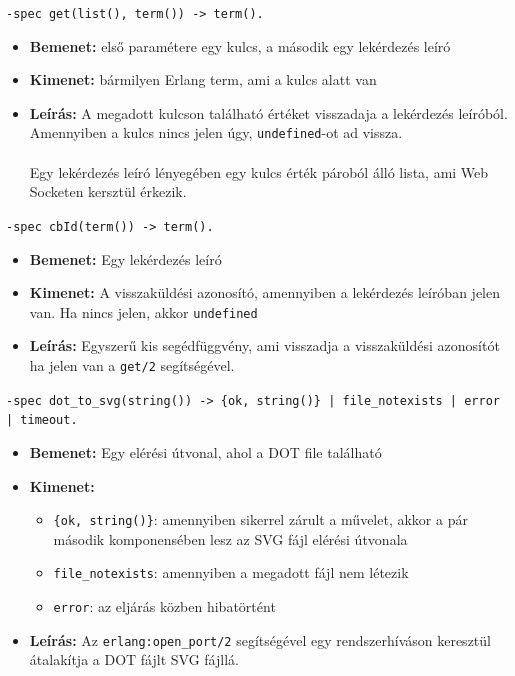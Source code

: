 \noindent \lstinline{-spec get(list(), term()) -> term().}
\begin{itemize}
    \item \textbf{Bemenet:} első paramétere egy kulcs, a második egy lekérdezés leíró
    \item \textbf{Kimenet:} bármilyen Erlang term, ami a kulcs alatt van
    \item \textbf{Leírás:} A megadott kulcson található értéket visszadaja a lekérdezés leíróból. Amennyiben a kulcs nincs jelen úgy, \lstinline{undefined}-ot ad vissza.\\ \\ Egy lekérdezés leíró lényegében egy kulcs érték pároból álló lista, ami Web Socketen kersztül érkezik.
\end{itemize} 

\noindent \lstinline{-spec cbId(term()) -> term().}
\begin{itemize}
    \item \textbf{Bemenet:} Egy lekérdezés leíró
    \item \textbf{Kimenet:} A visszaküldési azonosító, amennyiben a lekérdezés leíróban jelen van. Ha nincs jelen, akkor \lstinline{undefined}
    \item \textbf{Leírás:} Egyszerű kis segédfüggvény, ami visszadja a visszaküldési azonosítót ha jelen van a \lstinline{get/2} segítségével.
\end{itemize} 

\noindent \lstinline|-spec dot_to_svg(string()) -> {ok, string()} |\lstinline{| file_notexists | error | timeout.}
\begin{itemize}
    \item \textbf{Bemenet:} Egy elérési útvonal, ahol a DOT file található
    \item \textbf{Kimenet:} 
    \begin{itemize}
        \item \lstinline|{ok, string()}|: amennyiben sikerrel zárult a művelet, akkor a pár második komponensében lesz az SVG fájl elérési útvonala
        \item \lstinline|file_notexists|: amennyiben a megadott fájl nem létezik
        \item \lstinline|error|: az eljárás közben hibatörtént
    \end{itemize}
    \item \textbf{Leírás:} Az \lstinline{erlang:open_port/2} segítségével egy rendszerhíváson keresztül átalakítja a DOT fájlt SVG fájllá.
\end{itemize}


